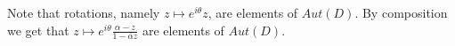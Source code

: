 \begin{remark}
Note that rotations, namely $z \mapsto e^{i \theta} z$, are elements of $Aut(D)$. By composition we get that $z \mapsto e^{i \theta} \frac{\alpha - z}{ 1 - \overline{\alpha} z}$ are elements of $Aut(D)$. 

\end{remark}












 